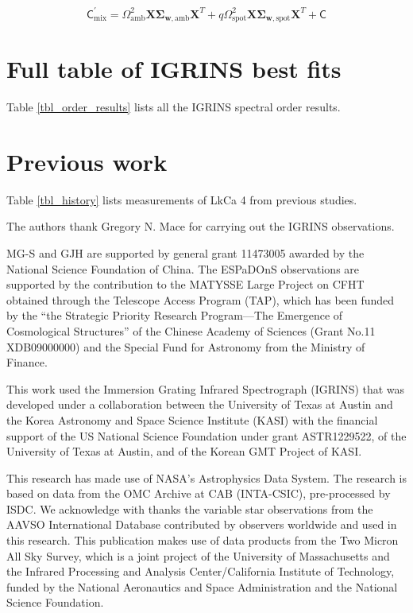 \documentclass[twocolumn]{emulateapj}%
\newcommand{\name}{LkCa 4 }
\begin{document}
\begin{equation}
  \mathsf{C}_{\mathrm{mix}}^\prime = \Omega_{\mathrm{amb}}^2 \mathbf{X} \mathbf{\Sigma}_\mathbf{w, \mathrm{amb}} \mathbf{X}^T + q \Omega_{\mathrm{spot}}^2 \mathbf{X} \mathbf{\Sigma}_\mathbf{w, \mathrm{spot}} \mathbf{X}^T + \mathsf{C}
  \label{eqn:modC}
\end{equation}


\section{Full table of IGRINS best fits}

Table \ref{tbl_order_results} lists all the IGRINS spectral order results.
\LongTables


\section{Previous work}

Table \ref{tbl_history} lists measurements of \name from previous studies.




\acknowledgements
The authors thank Gregory N. Mace for carrying out the IGRINS observations. 

MG-S and GJH are supported by general grant 11473005 awarded by the National Science Foundation of China.   The ESPaDOnS observations are supported by the contribution to the MATYSSE Large Project on CFHT obtained through the Telescope Access Program (TAP), which has been funded by the ``the Strategic Priority Research Program---The Emergence of Cosmological Structures'' of the Chinese Academy of Sciences (Grant No.11 XDB09000000) and the Special Fund for Astronomy from the Ministry of Finance. 

This work used the Immersion Grating Infrared Spectrograph (IGRINS) that was developed under a collaboration between the University of Texas at Austin and the Korea Astronomy and Space Science Institute (KASI) with the financial support of the US National Science Foundation under grant ASTR1229522, of the University of Texas at Austin, and of the Korean GMT Project of KASI.

This research has made use of NASA's Astrophysics Data System.  The research is based on data from the OMC Archive at CAB (INTA-CSIC), pre-processed by ISDC.
We acknowledge with thanks the variable star observations from the AAVSO International Database contributed by observers worldwide and used in this research.
This publication makes use of data products from the Two Micron All Sky Survey, which is a joint project of the University of Massachusetts and the Infrared Processing and Analysis Center/California Institute of Technology, funded by the National Aeronautics and Space Administration and the National Science Foundation.
\end{document}
